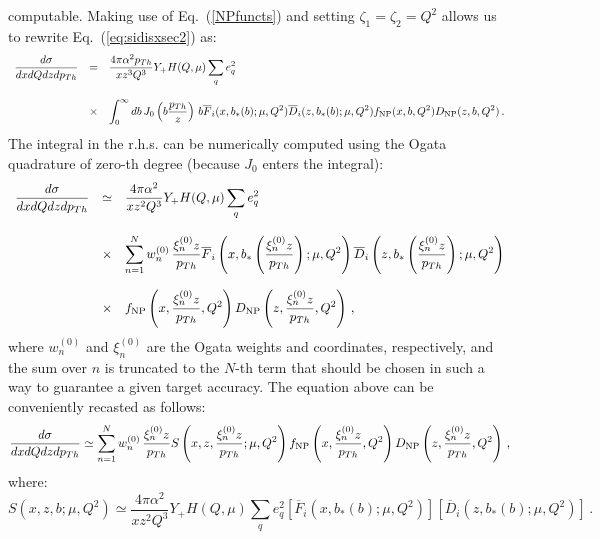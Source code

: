 \documentclass[10pt,a4paper]{article}
\begin{document}
computable. Making use of Eq.~(\ref{NPfuncts}) and setting
$\zeta_1=\zeta_2=Q^2$ allows us to rewrite Eq.~(\ref{eq:sidisxsec2})
as:
\begin{equation}\label{eq:sidisxsec3}
\begin{array}{rcl}
\displaystyle   \frac{d\sigma}{dxdQdz d p_{Th}} &=&\displaystyle
\frac{4\pi \alpha^2p_{Th}}{xz^3Q^3}Y_+ H(Q,\mu) \sum_q e_q^2\\
\\
&\times&\displaystyle 
  \int_0^\infty db\, J_0\left(b\frac{p_{Th}}{z}\right) \,b\overline{F}_i(x,b_*(b);\mu,Q^2) \overline{D}_i(z,b_*(b);\mu,Q^2) f_{\rm NP}(x,b,Q^2) D_{\rm NP}(z,b,Q^2)\,.
\end{array}
\end{equation}
The integral in the r.h.s. can be numerically computed using the Ogata
quadrature of zero-th degree (because $J_0$ enters the integral):
\begin{equation}
\begin{array}{rcl}
\displaystyle   \frac{d\sigma}{dxdQdz d p_{Th}} &\simeq&\displaystyle
\frac{4\pi \alpha^2}{xz^2Q^3}Y_+ H(Q,\mu) \sum_q e_q^2\\
\\
&\times&\displaystyle
  \sum_{n=1}^{N}w_n^{(0)}\,\frac{\xi_n^{(0)}z}{p_{Th}}\overline{F}_i\left(x,b_*\left(\frac{\xi_n^{(0)}z}{p_{Th}}\right);\mu,Q^2\right)
         \overline{D}_i\left(z,b_*\left(\frac{\xi_n^{(0)}z}{p_{Th}}\right);\mu,Q^2\right)\\
\\
&\times& \displaystyle f_{\rm NP}\left(x, \frac{\xi_n^{(0)}z}{p_{Th}},Q^2\right) D_{\rm NP}\left(z, \frac{\xi_n^{(0)}z}{p_{Th}},Q^2\right)\,,
\end{array}
\end{equation}
where $w_n^{(0)}$ and $\xi_n^{(0)}$ are the Ogata weights and
coordinates, respectively, and the sum over $n$ is truncated to the
$N$-th term that should be chosen in such a way to guarantee a given
target accuracy. The equation above can be conveniently recasted as
follows:
\begin{equation}
\displaystyle \frac{d\sigma}{dxdQdz d p_{Th}} \simeq
  \sum_{n=1}^{N}w_n^{(0)}\,\frac{\xi_n^{(0)}z}{p_{Th}}S\left(x,z,\frac{\xi_n^{(0)}z}{p_{Th}};\mu,Q^2\right) f_{\rm NP}\left(x, \frac{\xi_n^{(0)}z}{p_{Th}},Q^2\right) D_{\rm NP}\left(z, \frac{\xi_n^{(0)}z}{p_{Th}},Q^2\right)\,,
\end{equation}
where:
\begin{equation}\label{eq:Sall}
\displaystyle S\left(x,z,b;\mu,Q^2\right)\simeq
\frac{4\pi \alpha^2}{xz^2Q^3}Y_+ H(Q,\mu) \sum_q e_q^2 \left[\overline{F}_i\left(x,b_*(b);\mu,Q^2\right)\right]\left[\overline{D}_i\left(z,b_*(b);\mu,Q^2\right)\right]\,.
\end{equation}
\end{document}

